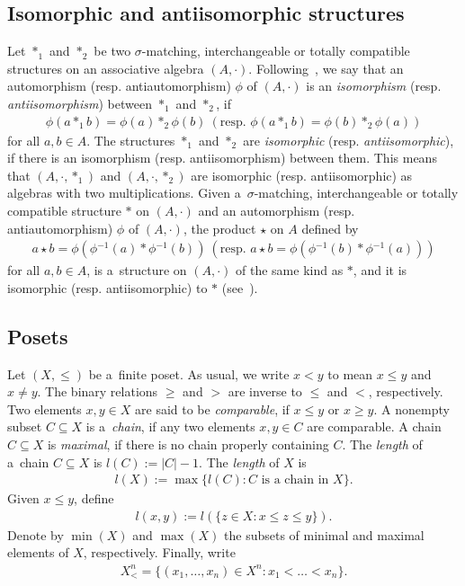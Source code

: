 \documentclass{jonasart}
\newcommand{\m}{{}^{-1}}
\newcommand{\sg}{\sigma}
\newcommand{\sst}{\subseteq}
\begin{document}
	\subsection{Isomorphic and antiisomorphic structures}
	Let $*_1$ and $*_2$ be two $\sg$-matching, interchangeable or totally compatible structures on an associative algebra $(A,\cdot)$. Following~\cite{Khr2024,Khr2024b}, we say that an automorphism (resp. antiautomorphism) $\phi$ of $(A,\cdot)$ is an \textit{isomorphism} (resp. \textit{antiisomorphism}) between $*_1$ and $*_2$, if
	\begin{align*}
		\phi(a*_1 b)=\phi(a)*_2\phi(b)\ (\text{resp. }\phi(a*_1 b)=\phi(b)*_2\phi(a))
	\end{align*}
	for all $a,b\in A$. The structures $*_1$ and $*_2$ are \textit{isomorphic} (resp. \textit{antiisomorphic}), if there is an isomorphism (resp. antiisomorphism) between them. This means that $(A,\cdot,*_1 )$ and $(A,\cdot,*_2 )$ are isomorphic (resp. antiisomorphic) as algebras with two multiplications. Given a~$\sg$-matching, interchangeable or totally compatible structure $*$ on $(A,\cdot)$ and an automorphism (resp. antiautomorphism) $\phi$ of $(A,\cdot)$, the product $\star$ on $A$ defined by
	\begin{align}
		a\star b=\phi(\phi\m(a)*\phi\m(b))\ (\text{resp. }a\star b=\phi(\phi\m(b)*\phi\m(a)))
	\end{align}
	for all $a,b\in A$, is a~structure on $(A,\cdot)$ of the same kind as $*$, and it is isomorphic (resp. antiisomorphic) to $*$ (see~\cite[Lemma 1.2]{Khr2024b}).

	\subsection{Posets}

	Let $(X,\le)$ be a~finite poset. As usual, we write $x<y$ to mean $x\le y$ and $x\ne y$. The binary relations $\ge$ and $>$ are inverse to $\le$ and $<$, respectively. Two elements $x,y\in X$ are said to be \textit{comparable}, if $x\le y$ or $x\ge y$. A nonempty subset $C\sst X$ is a~\textit{chain}, if any two elements $x,y\in C$ are comparable. A chain $C\sst X$ is \textit{maximal}, if there is no chain properly containing $C$. The \textit{length} of a~chain $C\sst X$ is $l(C):=|C|-1$. The \textit{length} of $X$ is
	\begin{align*}
		l(X):=\max\{l(C): C\text{ is a~chain in }X\}.
	\end{align*}
	Given $x\le y$, define
	\begin{align*}
		l(x,y):=l(\{z\in X: x\leq z\leq y\}).
	\end{align*}
	Denote by $\min(X)$ and $\max(X)$ the subsets of minimal and maximal elements of $X$, respectively. Finally, write
	\begin{align*}
		X^n_< =\{(x_1,\dots,x_n )\in X^n: x_1 <\dots<x_n\}.
	\end{align*}
\end{document}
